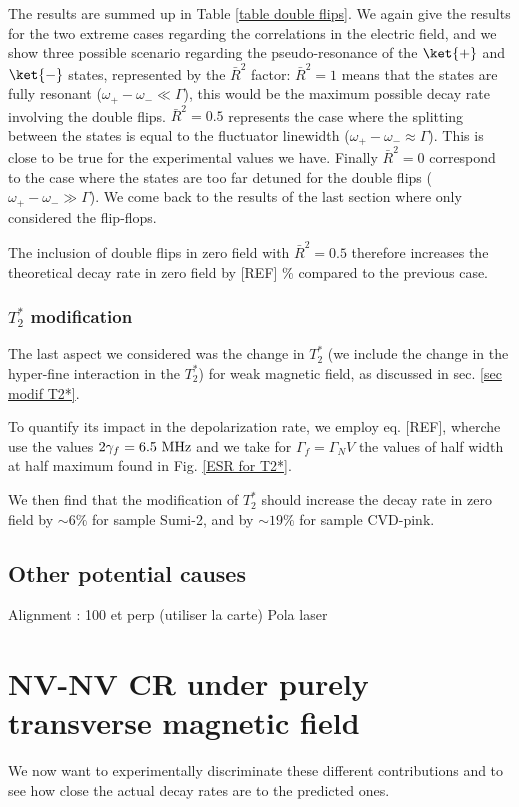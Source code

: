 \documentclass[a4paper,11pt]{report}
\begin{document}
The results are summed up in Table \ref{table double flips}. We again give the results for the two extreme cases regarding the correlations in the electric field, and we show three possible scenario regarding the pseudo-resonance of the $\ket{+}$ and $\ket{-}$ states, represented by the $\bar{R}^2$ factor: $\bar{R}^2=1$ means that the states are fully resonant ($\omega_+-\omega_- \ll \Gamma $), this would be the maximum possible decay rate involving the double flips. $\bar{R}^2=0.5$ represents the case where the splitting between the states is equal to the fluctuator linewidth ($\omega_+-\omega_- \approx \Gamma$). This is close to be true for the experimental values we have. Finally $\bar{R}^2=0$ correspond to the case where the states are too far detuned for the double flips ($\omega_+-\omega_- \gg \Gamma $). We come back to the results of the last section where only considered the flip-flops.

The inclusion of double flips in zero field with $\bar{R}^2=0.5$ therefore increases the theoretical  decay rate in zero field by [REF] \% compared to the previous case. 
\subsubsection{$T_2^*$ modification}

The last aspect we considered was the change in $T_2^*$ (we include the change in the hyper-fine interaction in the $T_2^*$) for weak magnetic field, as discussed in sec. \ref{sec modif T2*}.

To quantify its impact in the depolarization rate, we employ eq. [REF], wherche use the values $2\gamma_f = 6.5\ \rm MHz$ and we take for $\Gamma_f=\Gamma_NV$ the values of half width at half maximum found in Fig. \ref{ESR for T2*}. 

We then find that the modification of $T_2^*$ should increase the decay rate in zero field by $\sim 6 \%$ for sample Sumi-2, and by $\sim 19 \%$ for sample CVD-pink. 
\subsection{Other potential causes}
Alignment : 100 et perp (utiliser la carte)
Pola laser

\section{NV-NV CR under purely transverse magnetic field}
We now want to experimentally discriminate these different contributions and to see how close the actual decay rates are to the predicted ones. 
\end{document}
